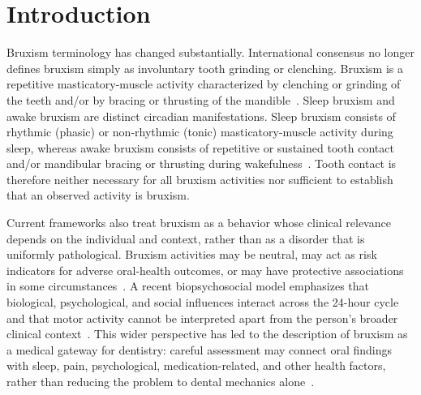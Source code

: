 \documentclass[pdflatex,sn-nature,iicol]{sn-jnl}
\begin{document}
\color{blue}
\color{black}

\maketitle

\color{black}
\section{Introduction}

\color{blue}
Bruxism terminology has changed substantially. International consensus no longer defines bruxism simply as involuntary tooth grinding or clenching. Bruxism is a repetitive masticatory-muscle activity characterized by clenching or grinding of the teeth and/or by bracing or thrusting of the mandible~\cite{lobbezoo2018international,verhoeff2025definitions}. Sleep bruxism and awake bruxism are distinct circadian manifestations. Sleep bruxism consists of rhythmic (phasic) or non-rhythmic (tonic) masticatory-muscle activity during sleep, whereas awake bruxism consists of repetitive or sustained tooth contact and/or mandibular bracing or thrusting during wakefulness~\cite{verhoeff2025definitions}. Tooth contact is therefore neither necessary for all bruxism activities nor sufficient to establish that an observed activity is bruxism.

Current frameworks also treat bruxism as a behavior whose clinical relevance depends on the individual and context, rather than as a disorder that is uniformly pathological. Bruxism activities may be neutral, may act as risk indicators for adverse oral-health outcomes, or may have protective associations in some circumstances~\cite{lobbezoo2018international,verhoeff2025definitions}. A recent biopsychosocial model emphasizes that biological, psychological, and social influences interact across the 24-hour cycle and that motor activity cannot be interpreted apart from the person's broader clinical context~\cite{manfredini2026biopsychosocial}. This wider perspective has led to the description of bruxism as a medical gateway for dentistry: careful assessment may connect oral findings with sleep, pain, psychological, medication-related, and other health factors, rather than reducing the problem to dental mechanics alone~\cite{manfredini2024evolution}.
\color{black}
\end{document}
